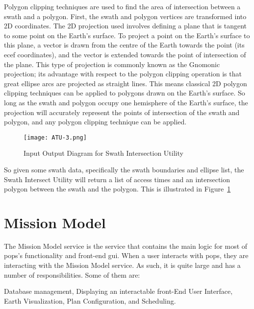 Polygon clipping techniques are used to find the area of intersection between a
swath and a polygon. First, the swath and polygon vertices are transformed into
2D coordinates. The 2D projection used involves defining a plane that is
tangent to some point on the Earth’s surface.  To project a point on the
Earth’s surface to this plane, a vector is drawn from the centre of the Earth
towards the point (its \gls{ecef} coordinates), and the vector is extended
towards the point of intersection of the plane. This type of projection is
commonly known as the Gnomonic projection; its advantage with respect to the
polygon clipping operation is that great ellipse arcs are projected as straight
lines.  This means classical 2D polygon clipping techniques can be applied to
polygons drawn on the Earth’s surface. So long as the swath and polygon occupy
one hemisphere of the Earth’s surface, the projection will accurately represent
the points of intersection of the swath and polygon, and any polygon clipping
technique can be applied.


\begin{figure}[h]
    \centering
    \texttt{[image: ATU-3.png]} 
    \caption{Input Output Diagram for Swath Intersection Utility}
    \label{fig:atu-3} 
\end{figure}

So given some swath data, specifically the swath boundaries and ellipse list,
the Swath Intersect Utility will return a list of access times and an
intersection polygon between the swath and the polygon. This is illustrated in
Figure~\ref{fig:atu-3}


\section{Mission Model}
 
The Mission Model service is the service that contains the main logic for most
of \gls{pops}'s functionality and front-end \gls{gui}. When a user interacts
with \gls{pops}, they are interacting with the Mission Model service. As such,
it is quite large and has a number of responsibilities. Some of them are:

\begin{outline} 
    \1 Database management,
    \1 Displaying an interactable front-End User Interface,
    \1 Earth Visualization,
    \1 Plan Configuration, and
    \1 Scheduling.
\end{outline}


